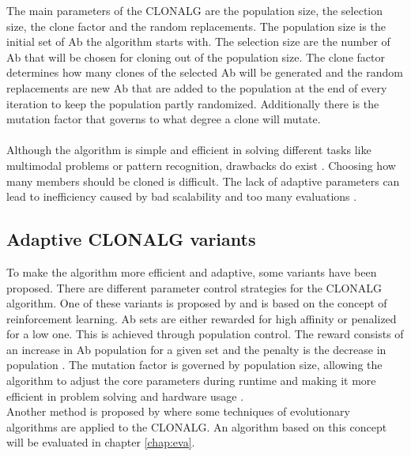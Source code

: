 The main parameters of the CLONALG are the population size, the selection size, the clone factor and the random replacements. The population size is the initial set of Ab the algorithm starts with. The selection size are the number of Ab that will be chosen for cloning out of the population size. The clone factor determines how many clones of the selected Ab will be generated and the random replacements are new Ab that are added to the population at the end of every iteration to keep the population partly randomized. Additionally there is the mutation factor that governs to what degree a clone will mutate.\\\\
Although the algorithm is simple and efficient in solving different tasks like multimodal problems or pattern recognition, drawbacks do exist \cite{Garret04}. Choosing how many members should be cloned is difficult. The lack of adaptive parameters can lead to inefficiency caused by bad scalability and too many evaluations \cite{Garret04}.
\subsection{Adaptive CLONALG variants}
To make the algorithm more efficient and adaptive, some variants have been proposed. There are different parameter control strategies for the CLONALG algorithm. One of these variants is proposed by \cite{RIFF09} and is based on the concept of reinforcement learning. Ab sets are either rewarded for high affinity or penalized for a low one. This is achieved through population control. The reward consists of an increase in Ab population for a given set and the penalty is the decrease in population \cite{RIFF09}. The mutation factor is governed by population size, allowing the algorithm to adjust the core parameters during runtime and making it more efficient in problem solving and hardware usage \cite{RIFF09}.\\
Another method is proposed by \cite{Garret04} where some techniques of evolutionary algorithms are applied to the CLONALG. An algorithm based on this concept will be evaluated in chapter \ref{chap:eva}.
 




